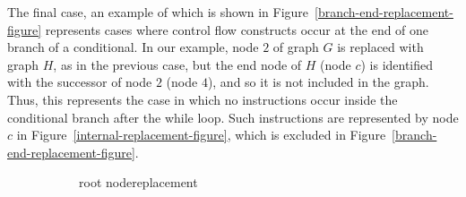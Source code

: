 The final case, an example of which is shown in
Figure~\ref{branch-end-replacement-figure} represents cases where
control flow constructs occur at the end of one branch of a
conditional.
In our example, node $2$ of graph $G$ is replaced with graph $H$, as
in the previous case, but the end node of $H$ (node $c$) is identified
with the successor of node $2$ (node $4$), and so it is not included
in the graph.
Thus, this represents the case in which no instructions occur inside
the conditional branch after the while loop.
Such instructions are represented by node $c$ in
Figure~\ref{internal-replacement-figure}, which is excluded in
Figure~\ref{branch-end-replacement-figure}.

\begin{figure}
  \begin{subfigure}{0.24\textwidth}
    \begin{center}
    \caption{\centering root node\newline replacement}
    \label{root-replacement-figure}
  \end{center}
  \end{subfigure}
  \begin{subfigure}{0.24\textwidth}
    \begin{center}
\end{center}
\end{subfigure}
\end{figure}
